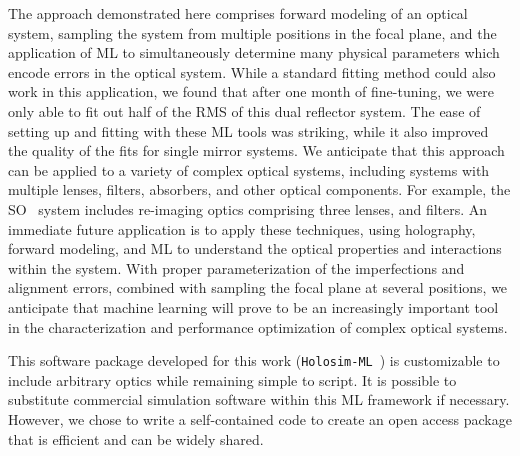 The approach demonstrated here comprises forward modeling of an optical system, sampling the system from multiple positions in the focal plane, and the application of ML to simultaneously determine many physical parameters which encode errors in the optical system.  While a standard fitting method could also work in this application, we found that after one month of fine-tuning, we were only able to fit out half of the RMS of this dual reflector system.  The ease of setting up and fitting with these ML tools was striking, while it also improved the quality of the fits for single mirror systems.  We anticipate that this approach can be applied to a variety of complex optical systems, including systems with multiple lenses, filters, absorbers, and other optical components.  For example, the SO~\cite{gali18} system includes re-imaging optics comprising three lenses, and filters.  An immediate future application is to apply these techniques, using holography, forward modeling, and ML to understand the optical properties and interactions within the system.  With proper parameterization of the imperfections and alignment errors, combined with sampling the focal plane at several positions, we anticipate that machine learning will prove to be an increasingly important tool in the characterization and performance optimization of complex optical systems. 

This software package developed for this work (\verb|Holosim-ML|~\cite{McMahonCosmologyLab}) is customizable to include arbitrary optics while remaining simple to script.  It is possible to substitute commercial simulation software within this ML framework if necessary.  However, we chose to write a self-contained code to create an open access package that is efficient and can be widely shared.